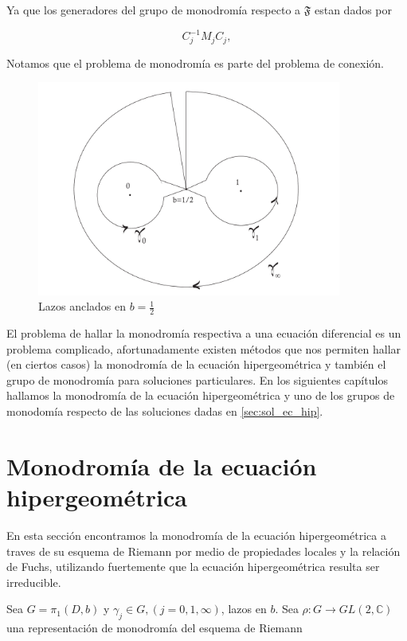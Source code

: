 Ya que los generadores del grupo de monodrom\'ia respecto a $\mathfrak{F}$ estan dados por

$$C_{j}^{-1} M_{j} C_{j} ,$$

Notamos que el problema de monodrom\'ia es parte del problema de conexi\'on.



\begin{figure}[h] \label{lazos3}
  \centering
  \includegraphics[width=10cm]{lazos3.pdf}
  \caption{Lazos anclados en $b=\frac{1}{2}$} \label{lazos3}
\end{figure}


El problema de hallar la monodrom\'ia respectiva a una ecuaci\'on diferencial es un problema complicado, afortunadamente existen m\'etodos que nos permiten hallar (en ciertos casos) la monodrom\'ia de la ecuaci\'on hipergeom\'etrica y tambi\'en el grupo de monodrom\'ia para soluciones particulares. En los siguientes cap\'itulos hallamos la monodrom\'ia de la ecuaci\'on hipergeom\'etrica y uno de los grupos de monodom\'ia respecto de las soluciones dadas en \ref{sec:sol_ec_hip}.


\section{Monodrom\'ia de la ecuaci\'on hipergeom\'etrica}

En esta secci\'on encontramos la monodrom\'ia de la ecuaci\'on hipergeom\'etrica a traves de su esquema de Riemann por medio de propiedades locales y la relaci\'on de Fuchs, utilizando fuertemente que la ecuaci\'on hipergeom\'etrica resulta ser irreducible.

Sea $G=\pi_{1} (D,b) $ y $\gamma_{j} \in G, (j=0,1,\infty )$, lazos en $b$. Sea $\rho: G \rightarrow GL(2,\mathbb{C}) $ una representaci\'on de monodrom\'ia del esquema de Riemann

